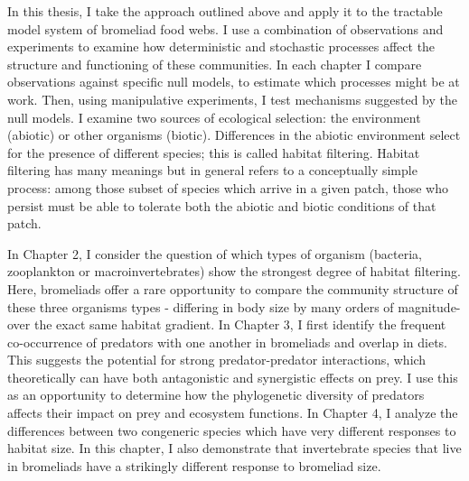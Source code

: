 In this thesis, I take the approach outlined above and apply it to the
tractable model system of bromeliad food webs. I use a combination of
observations and experiments to examine how deterministic and stochastic
processes affect the structure and functioning of these communities. In
each chapter I compare observations against specific null models, to
estimate which processes might be at work. Then, using manipulative
experiments, I test mechanisms suggested by the null models. I examine
two sources of ecological selection: the environment (abiotic) or other
organisms (biotic). Differences in the abiotic environment select for
the presence of different species; this is called habitat filtering.
Habitat filtering has many meanings \citep{Southwood1977, Kraft2015} but
in general refers to a conceptually simple process: among those subset
of species which arrive in a given patch, those who persist must be able
to tolerate both the abiotic and biotic conditions of that patch.

In Chapter 2, I consider the question of which types of organism
(bacteria, zooplankton or macroinvertebrates) show the strongest degree
of habitat filtering. Here, bromeliads offer a rare opportunity to
compare the community structure of these three organisms types -
differing in body size by many orders of magnitude- over the exact same
habitat gradient. In Chapter 3, I first identify the frequent
co-occurrence of predators with one another in bromeliads and overlap in
diets. This suggests the potential for strong predator-predator
interactions, which theoretically can have both antagonistic and
synergistic effects on prey. I use this as an opportunity to determine
how the phylogenetic diversity of predators affects their impact on prey
and ecosystem functions. In Chapter 4, I analyze the differences between
two congeneric species which have very different responses to habitat
size. In this chapter, I also demonstrate that invertebrate species that
live in bromeliads have a strikingly different response to bromeliad
size.

